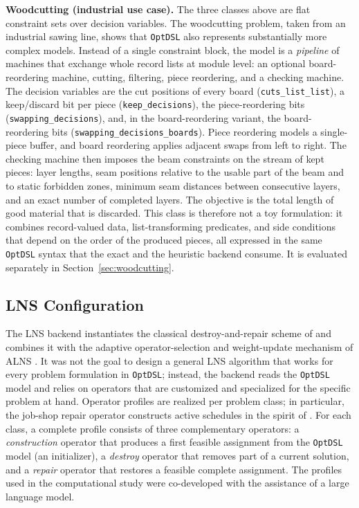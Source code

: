 \documentclass[11pt,a4paper]{article}
\begin{document}
\textbf{Woodcutting (industrial use case).}
The three classes above are flat constraint sets over decision variables.
The woodcutting problem, taken from an industrial sawing line, shows that
\texttt{OptDSL} also represents substantially more complex models.
Instead of a single constraint block, the model is a \emph{pipeline} of
machines that exchange whole record lists at module level: an optional
board-reordering machine, cutting, filtering, piece reordering, and a
checking machine.
The decision variables are the cut positions of every board
(\texttt{cuts\_list\_list}), a keep/discard bit per piece
(\texttt{keep\_decisions}), the piece-reordering bits
(\texttt{swapping\_decisions}), and, in the board-reordering variant, the
board-reordering bits (\texttt{swapping\_decisions\_boards}).
Piece reordering models a single-piece buffer, and board
reordering applies adjacent swaps from left to right.
The checking machine then imposes the beam constraints on the stream of kept
pieces: layer lengths, seam positions relative to the usable part of the beam
and to static forbidden zones, minimum seam distances between consecutive
layers, and an exact number of completed layers.
The objective is the total length of good material that is discarded.
This class is therefore not a toy formulation: it combines record-valued
data, list-transforming predicates, and side conditions that depend on the
order of the produced pieces, all expressed in the same \texttt{OptDSL}
syntax that the exact and the heuristic backend consume.
It is evaluated separately in Section~\ref{sec:woodcutting}.

\subsection{LNS Configuration}
The LNS backend instantiates the classical destroy-and-repair scheme of \citet{shaw1998lns} and combines it with the adaptive operator-selection and weight-update mechanism of ALNS \citep{ropke2006alns,pisinger2010lns,pisinger2019lns}.
It was not the goal to design a general LNS algorithm that works for every problem formulation in \texttt{OptDSL}; instead, the backend reads the \texttt{OptDSL} model and relies on operators that are customized and specialized for the specific problem at hand.
Operator profiles are realized per problem class; in particular, the job-shop repair operator constructs active schedules in the spirit of \citet{applegate1991}.
For each class, a complete profile consists of three complementary operators: a \emph{construction} operator that produces a first feasible assignment from the \texttt{OptDSL} model (an initializer), a \emph{destroy} operator that removes part of a current solution, and a \emph{repair} operator that restores a feasible complete assignment.
The profiles used in the computational study were co-developed with the assistance of a large language model.
\end{document}

